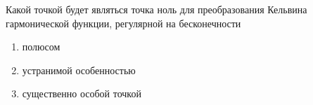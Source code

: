 Какой точкой будет являться точка ноль для преобразования Кельвина гармонической функции, регулярной на бесконечности

\begin{enumerate}[label=\arabic*)]
    \item полюсом
    \item устранимой особенностью
    \item существенно особой точкой
\end{enumerate}


